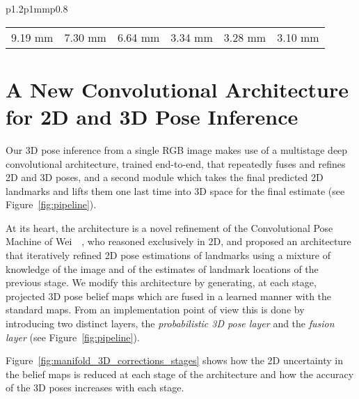 \documentclass[10pt,twocolumn,letterpaper]{article}
\begin{document}
\begin{figure*}
\begin{tabular}{p{}p{1mm}p{}}
\begin{center}
\begin{tabular}{cccccc}
\small  9.19 mm                                                & \small  7.30 mm & \small  6.64 mm & \small  3.34 mm & \small  3.28 mm & \small  3.10 mm
\end{tabular}
\end{center}
\end{tabular}
\vspace{-5mm}
\caption{\small Results returned by different stages of the
  architecture. \textit{Top Left}:~Evolution of the 2D skeleton after
  projecting the 3D points back into the 2D space;
  \textit{Bottom Left}:~Evolution of the beliefs for the landmark {\em Left
  hand} through the stages. \textit{Right}:~3D skeleton
  with the relative mean error per landmark in
  millimeters. Even with incorrect
  landmark locations, the model returns a physically
  plausible solution.\label{fig:manifold_3D_corrections_stages}\vspace{-5mm}}
\end{figure*}

\section{A New Convolutional Architecture for 2D and 3D Pose Inference}
\label{sec:pose-inference}
Our 3D pose inference from a single RGB image makes use of a
multistage deep convolutional architecture, trained end-to-end, that
repeatedly fuses and refines 2D and 3D poses, and a second module
which takes the final predicted 2D landmarks and lifts them one last
time into 3D space for the  final estimate (see
Figure~\ref{fig:pipeline}).

At its heart, the  architecture is a novel refinement of the
Convolutional Pose Machine of Wei~\etal~\cite{wei2016convolutional}, who reasoned exclusively in
2D, and proposed an architecture that iteratively refined 2D pose
estimations of landmarks using a mixture of knowledge of the image and
of the estimates of landmark locations of the previous stage. We
modify this architecture by generating, at each stage, projected 3D
pose belief maps which are fused in a learned manner with the standard
maps. From an implementation point of view this is done by introducing
two distinct layers, the \textit{probabilistic 3D pose layer} and the
\textit{fusion layer} (see Figure~\ref{fig:pipeline}).

Figure~\ref{fig:manifold_3D_corrections_stages} shows how the 2D
uncertainty in the belief maps is reduced at each stage of the
architecture and how the accuracy of the 3D poses increases with each
stage. 
\end{document}

